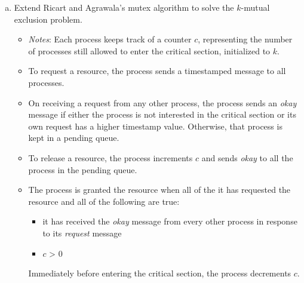 \documentclass[11pt]{article}
\newcounter{problem}
\begin{document}
\begin{enumerate}
\begin{enumerate}[(a)]
  \item Extend Ricart and Agrawala's mutex algorithm to solve the $k$-mutual
    exclusion problem.

    \begin{itemize}
    \item \emph{Notes}: Each process keeps track of a counter $c$, representing the
      number of processes still allowed to enter the critical section, initialized
      to $k$.
    \item To request a resource, the process sends a timestamped message to all
      processes.
    \item On receiving a request from any other process, the process sends an
      \emph{okay} message if either the process is not interested in the critical
      section or its own request has a higher timestamp value. Otherwise, that
      process is kept in a pending queue.
    \item To release a resource, the process increments $c$ and sends \emph{okay} to
      all the process in the pending queue.
    \item The process is granted the resource when all of the it has requested the
      resource and all of the following are true:
      \begin{itemize}
      \item it has received the \emph{okay} message from every other process in
        response to its \emph{request} message
      \item $c$ > 0
      \end{itemize}
      Immediately before entering the critical section, the process decrements $c$.
    \end{itemize}

  \end{enumerate}
\end{enumerate}
\end{document}
